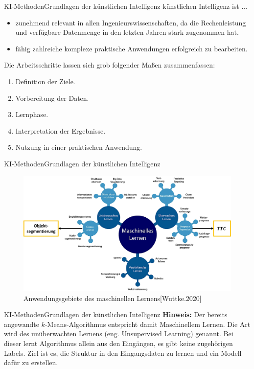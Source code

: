 \documentclass[169, handout	]{THIbeamer} %
\begin{document}
	\begin{frame}{KI-Methoden}{Grundlagen der künstlichen Intelligenz}
		künstlichen Intelligenz ist ...
		\begin{itemize}
			\item zunehmend relevant in allen Ingenieurswissenschaften, da die Rechenleistung und verfügbare Datenmenge in den letzten Jahren stark zugenommen hat.
			\item fähig zahlreiche komplexe praktische Anwendungen erfolgreich zu bearbeiten.
	\end{itemize}		
		Die Arbeitsschritte lassen sich grob folgender Maßen zusammenfassen:
		\begin{enumerate}
			\item Definition der Ziele.
			\item Vorbereitung der Daten.
			\item Lernphase.
			\item Interpretation der Ergebnisse.
			\item Nutzung in einer praktischen Anwendung.
		\end{enumerate}
	\end{frame}
    \begin{frame}{KI-Methoden}{Grundlagen der künstlichen Intelligenz}
		\begin{figure}
			\includegraphics[scale=0.4]{required/Bereiche_Machine_Learning.jpg}
			\caption{Anwendungsgebiete des maschinellen Lernens[Wuttke.2020]}
        	\label{Ground Subtraction}
       	\end{figure}
     
    \end{frame}
    \begin{frame}{KI-Methoden}{Grundlagen der künstlichen Intelligenz}
		\vspace{1cm}       	
       	\textbf{Hinweis:} Der bereits angewandte $k$-Means-Algorithmus entspricht damit Maschinellem Lernen. Die Art wird des unüberwachten Lernens (eng. Unsupervised Learning) genannt. Bei dieser lernt Algorithmus allein aus den Eingängen, es gibt keine zugehörigen Labels. Ziel ist es, die Struktur in den Eingangsdaten zu lernen und ein Modell dafür zu erstellen.
	\end{frame}
\end{document}
